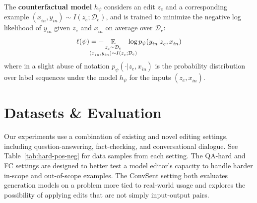 \documentclass{article}
\newcommand{\rep}{h_\psi}
\newcommand{\editdata}{\mathcal{D}_{e}}
\newcommand{\ze}[1][]{z_e^{#1}}
\newcommand{\xtest}[1][]{x_{in}^{#1}}
\newcommand{\ytest}[1][]{y_{in}^{#1}}
\DeclareMathOperator*{\E}{\mathbb{E}}
\begin{document}
The \textbf{counterfactual model} $\rep$ considers an edit $\ze$ and a corresponding example $(\xtest, \ytest)\sim I(\ze; \editdata)$, and is trained to minimize the negative log likelihood of $\ytest$ given $\ze$ and $\xtest$ on average over $\editdata$:
\begin{equation}
\ell(\psi) = - \hspace{-8mm} \E_{\substack{\ze \sim \editdata\\
(\xtest, \ytest) \sim I(\ze; \editdata)}} \hspace{-5mm} \log p_\psi(\ytest | \ze, \xtest)
\end{equation}
where in a slight abuse of notation $p_\psi(\cdot | \ze, \xtest)$ is the probability distribution over label sequences under the model $\rep$ for the inputs $(\ze, \xtest)$.



\section{Datasets \& Evaluation}
\label{sec:datasets}

Our experiments use a combination of existing and novel editing settings, including question-answering, fact-checking, and conversational dialogue. See Table~\ref{tab:hard-pos-neg} for data samples from each setting. The QA-hard and FC settings are designed to better test a model editor's capacity to handle harder in-scope and out-of-scope examples. The ConvSent setting both evaluates generation models on a problem more tied to real-world usage and explores the possibility of applying edits that are not simply input-output pairs.
\end{document}
